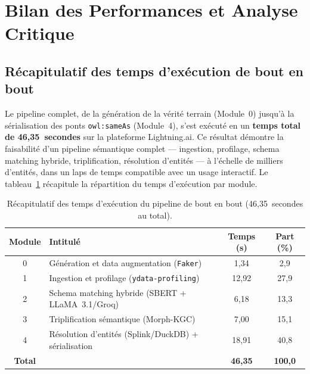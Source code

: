 \section{Bilan des Performances et Analyse Critique}
\label{sec:bilan}

\subsection{Récapitulatif des temps d'exécution de bout en bout}
\label{subsec:temps_execution}

Le pipeline complet, de la génération de la vérité terrain (Module~0)
jusqu'à la sérialisation des ponts \texttt{owl:sameAs} (Module~4),
s'est exécuté en un \textbf{temps total de 46,35~secondes} sur la
plateforme Lightning.ai. Ce résultat démontre la faisabilité d'un
pipeline sémantique complet --- ingestion, profilage, schema matching
hybride, triplification, résolution d'entités --- à l'échelle de
milliers d'entités, dans un laps de temps compatible avec un usage
interactif. Le tableau~\ref{tab:bilan_temps} récapitule la
répartition du temps d'exécution par module.

\begin{table}[h]
\centering
\caption{Récapitulatif des temps d'exécution du pipeline de bout en
         bout (46,35~secondes au total).}
\label{tab:bilan_temps}
\begin{tabular}{clcc}
\hline
\textbf{Module}
  & \textbf{Intitulé}
  & \textbf{Temps (s)}
  & \textbf{Part (\%)} \\
\hline
0 & Génération et data augmentation (\texttt{Faker})          &  1,34  &  2,9  \\
1 & Ingestion et profilage (\texttt{ydata-profiling})          & 12,92  & 27,9  \\
2 & Schema matching hybride (SBERT + LLaMA~3.1/Groq)          &  6,18  & 13,3  \\
3 & Triplification sémantique (Morph-KGC)                     &  7,00  & 15,1  \\
4 & Résolution d'entités (Splink/DuckDB) + sérialisation      & 18,91  & 40,8  \\
\hline
\textbf{Total}
  &
  & \textbf{46,35}
  & \textbf{100,0} \\
\hline
\end{tabular}
\end{table}

